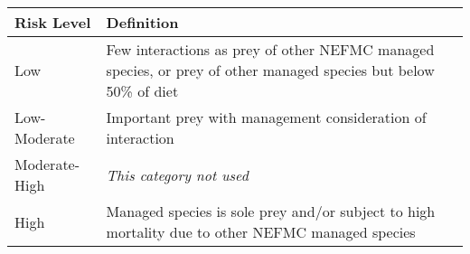 \documentclass[11pt,]{article}
\begin{document}
\begin{longtable}[]{@{}ll@{}}
\toprule
\begin{minipage}[b]{0.22\columnwidth}\raggedright\strut
Risk Level\strut
\end{minipage} & \begin{minipage}[b]{0.72\columnwidth}\raggedright\strut
Definition\strut
\end{minipage}\tabularnewline
\midrule
\endhead
\begin{minipage}[t]{0.22\columnwidth}\raggedright\strut
Low\strut
\end{minipage} & \begin{minipage}[t]{0.72\columnwidth}\raggedright\strut
Few interactions as prey of other NEFMC managed species, or prey of
other managed species but below 50\% of diet\strut
\end{minipage}\tabularnewline
\begin{minipage}[t]{0.22\columnwidth}\raggedright\strut
Low-Moderate\strut
\end{minipage} & \begin{minipage}[t]{0.72\columnwidth}\raggedright\strut
Important prey with management consideration of interaction\strut
\end{minipage}\tabularnewline
\begin{minipage}[t]{0.22\columnwidth}\raggedright\strut
Moderate-High\strut
\end{minipage} & \begin{minipage}[t]{0.72\columnwidth}\raggedright\strut
\emph{This category not used}\strut
\end{minipage}\tabularnewline
\begin{minipage}[t]{0.22\columnwidth}\raggedright\strut
High\strut
\end{minipage} & \begin{minipage}[t]{0.72\columnwidth}\raggedright\strut
Managed species is sole prey and/or subject to high mortality due to
other NEFMC managed species\strut
\end{minipage}\tabularnewline
\bottomrule
\end{longtable}
\end{document}

